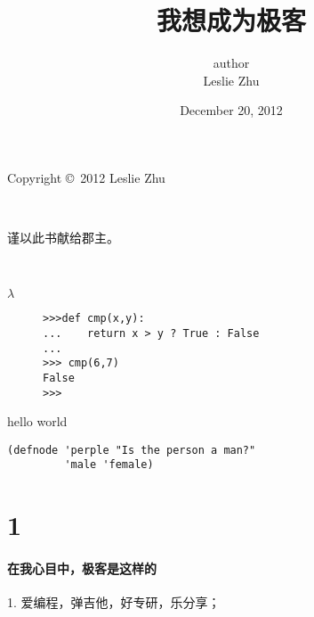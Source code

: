 \documentclass[11pt,a4paper]{book}
\begin{document}
\begin{CJK*}{UTF8}{nsung}
\newcommand\prechaptername{第}
\newcommand\postchaptername{章~}
\renewcommand\chapterformat{\prechaptername\CJKnumber{\value{chapter}}\postchaptername\enskip}

\begin{titlepage}
\pagestyle{empty}
\begin{center}
\title{我想成为极客}
\date{December 20, 2012}
\author{author \\ Leslie Zhu}
\maketitle
\vfill
Copyright \copyright\ 2012 Leslie Zhu
\end{center}

\newpage
~
\vfill
\begin{center}
  谨以此书献给郡主。
\end{center}
\vfill

\newpage
~
\vfill
\begin{center}
 $\lambda$
\end{center}
\vfill
\end{titlepage}



\begin{figure}
\begin{verbatim}
>>>def cmp(x,y):
...    return x > y ? True : False
...
>>> cmp(6,7)
False
>>> 
\end{verbatim}
\end{figure}
hello\newline
world\newline
\begin{verbatim}
(defnode 'perple "Is the person a man?"
         'male 'female)
\end{verbatim}
\chapter{1}

 \subsubsection{在我心目中，极客是这样的}

    1. 爱编程，弹吉他，好专研，乐分享；



\end{CJK*}
\end{document}
